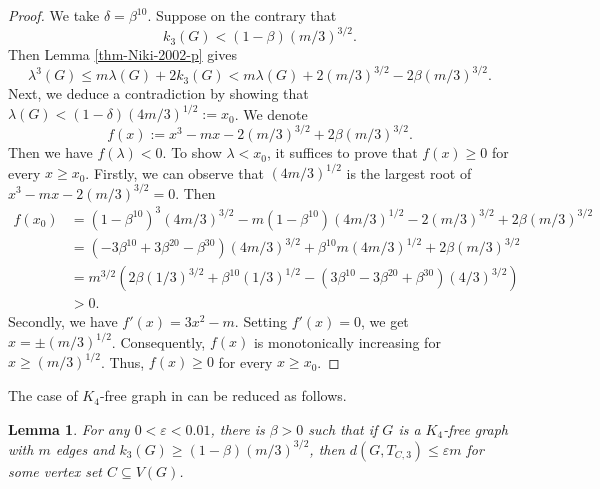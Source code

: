\documentclass[11pt,a4paper]{article}
\newtheorem{lemma}[theorem]{Lemma}
\theoremstyle{definition}
\theoremstyle{remark}
\begin{document}
\begin{proof}
We take $\delta = \beta^{10}$. 
Suppose on the contrary that  
\[ k_3(G)< (1- \beta) (m/3)^{3/2}. \]
Then Lemma \ref{thm-Niki-2002-p} gives 
\[  \lambda^3 (G) \le m\lambda(G) + 2k_3(G) < 
m \lambda (G) + 2 (m/3)^{3/2} - 2\beta (m/3)^{3/2}. \]
Next, we deduce a contradiction by showing that $\lambda(G) < (1- \delta) (4m/3)^{1/2}:=x_0$. We denote 
\[ f(x):=x^3 - mx - 2(m/3)^{3/2} + 2\beta (m/3)^{3/2}.  \]
Then we have $f(\lambda )<0$. To show $\lambda < x_0$, 
it suffices to prove that $f(x)\ge 0$ for every $x\ge x_0$. Firstly, we can observe that $(4m/3)^{1/2}$ is the largest root of 
$x^3 - m x - 2(m/3)^{3/2}=0$. Then 
\begin{align*}
    f(x_0) &= 
(1- \beta^{10})^3 (4m/3)^{3/2} - m (1- \beta^{10}) (4m/3)^{1/2} - 2(m/3)^{3/2} 
+ 2\beta (m/3)^{3/2}\\ 
&= (-3\beta^{10} + 3\beta^{20} - \beta^{30}) (4m/3)^{3/2} + \beta^{10} m (4m/3)^{1/2} +2\beta (m/3)^{3/2} \\
&= m^{3/2} \left(2\beta (1/3)^{3/2} + \beta^{10}(1/3)^{1/2} -(3\beta^{10} - 3\beta^{20}+ \beta^{30})(4/3)^{3/2} \right) \\
&>0.
\end{align*}
Secondly, we have $f'(x)=3x^2 - m$. Setting $f'(x)=0$, we get $x=\pm (m/3)^{1/2}$. Consequently, $f(x)$ is monotonically increasing for $x\ge (m/3)^{1/2}$. Thus, 
$f(x)\ge 0$ for every $x\ge x_0$. 
\end{proof}


The case of $K_4$-free graph in  can be reduced as follows. 

\begin{lemma}
    For any $0<\varepsilon <0.01$, there is $\beta >0$ such that if $G$ is a $K_4$-free graph with $m$ edges and $k_3(G)\ge (1- \beta)(m/3)^{3/2}$, then $d(G,T_{C,3})\le \varepsilon  m$ for some vertex set $C\subseteq V(G)$. 
\end{lemma}
\end{document}
